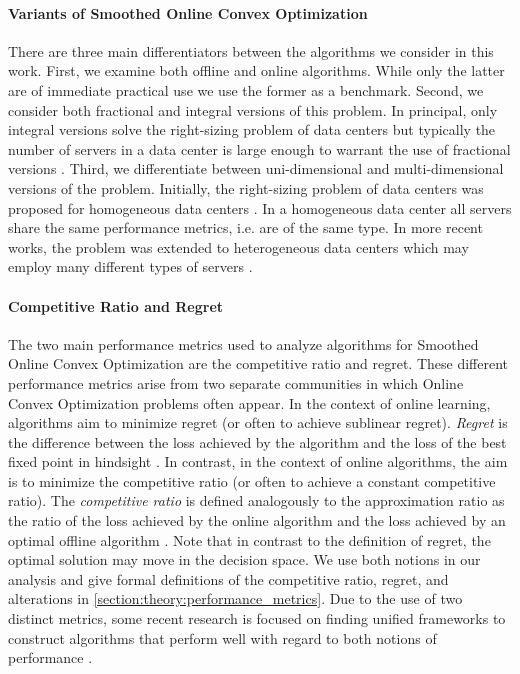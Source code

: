 \paragraph{Variants of Smoothed Online Convex Optimization} There are three main differentiators between the algorithms we consider in this work. First, we examine both offline and online algorithms. While only the latter are of immediate practical use we use the former as a benchmark. Second, we consider both fractional and integral versions of this problem. In principal, only integral versions solve the right-sizing problem of data centers but typically the number of servers in a data center is large enough to warrant the use of fractional versions \cite{Bansal2015}. Third, we differentiate between uni-dimensional and multi-dimensional versions of the problem. Initially, the right-sizing problem of data centers was proposed for homogeneous data centers \cite{Lin2011, Bansal2015, Albers2018}. In a homogeneous data center all servers share the same performance metrics, i.e. are of the same type. In more recent works, the problem was extended to heterogeneous data centers which may employ many different types of servers \cite{Lin2012, Chen2018, Goel2019, Albers2021, Albers2021_2}.

\paragraph{Competitive Ratio and Regret} The two main performance metrics used to analyze algorithms for Smoothed Online Convex Optimization are the competitive ratio and regret. These different performance metrics arise from two separate communities in which Online Convex Optimization problems often appear. In the context of online learning, algorithms aim to minimize regret (or often to achieve sublinear regret). \textit{Regret} is the difference between the loss achieved by the algorithm and the loss of the best fixed point in hindsight \cite{Chen2018}. In contrast, in the context of online algorithms, the aim is to minimize the competitive ratio (or often to achieve a constant competitive ratio). The \textit{competitive ratio} is defined analogously to the approximation ratio as the ratio of the loss achieved by the online algorithm and the loss achieved by an optimal offline algorithm \cite{Chen2018}. Note that in contrast to the definition of regret, the optimal solution may move in the decision space. We use both notions in our analysis and give formal definitions of the competitive ratio, regret, and alterations in \autoref{section:theory:performance_metrics}. Due to the use of two distinct metrics, some recent research is focused on finding unified frameworks to construct algorithms that perform well with regard to both notions of performance \cite{Chen2018, Goel2019}.

